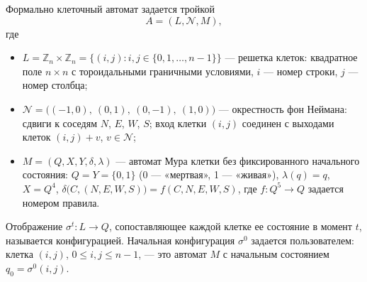 Формально клеточный автомат задается тройкой
\[
	A = (L, \mathcal{N}, M),
\]
где
\begin{itemize}
	\item $L = \mathbb{Z}_n \times \mathbb{Z}_n = \{(i, j) : i, j \in \{0, 1, \dots, n-1\}\}$ --- решетка клеток: квадратное поле $n \times n$ с тороидальными граничными условиями, $i$ --- номер строки, $j$ --- номер столбца;
	\item $\mathcal{N} = \bigl((-1, 0),\ (0, 1),\ (0, -1),\ (1, 0)\bigr)$ --- окрестность фон Неймана: сдвиги к соседям $N$, $E$, $W$, $S$; вход клетки $(i, j)$ соединен с выходами клеток $(i, j) + v$, $v \in \mathcal{N}$;
	\item $M = (Q, X, Y, \delta, \lambda)$ --- автомат Мура клетки без фиксированного начального состояния: $Q = Y = \{0, 1\}$ (0 --- «мертвая», 1 --- «живая»), $\lambda(q) = q$, $X = Q^4$, $\delta\bigl(C, (N, E, W, S)\bigr) = f(C, N, E, W, S)$, где $f: Q^5 \to Q$ задается номером правила.
\end{itemize}

Отображение $\sigma^t: L \to Q$, сопоставляющее каждой клетке ее состояние в момент $t$, называется конфигурацией. Начальная конфигурация $\sigma^0$ задается пользователем: клетка $(i, j)$, $0 \le i, j \le n-1$, --- это автомат $M$ с начальным состоянием $q_0 = \sigma^0(i, j)$.


